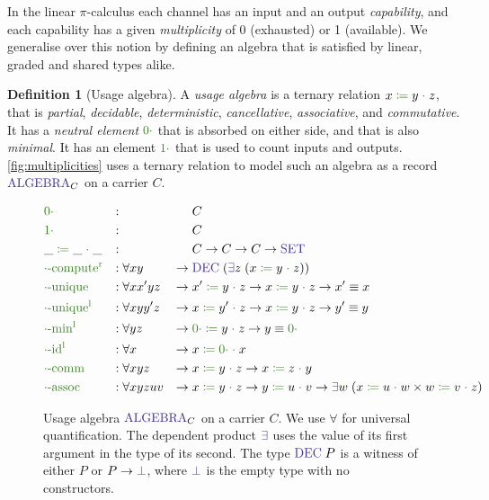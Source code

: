 \documentclass[a4paper,UKenglish,cleveref,autoref,thm-restate,authorcolumns]{lipics-v2019}
\theoremstyle{definition}
\newtheorem{nidefinition}{Definition}
\newcommand{\picalc}{$\pi$-calculus}
\newcommand{\type}[1]{\textcolor{BlueViolet}{\operatorname{#1}}}
\newcommand{\func}[1]{\textcolor{OliveGreen}{\operatorname{#1}}}
\newcommand{\op}[3]{#1 \; \func{\coloneqq} \; #2 \; \func{\cdot} \; #3}
\newcommand{\zero}{\func{0\cdot}}
\newcommand{\one}{\func{1\cdot}}
\newcommand{\Set}{\type{SET}}
\newcommand{\Algebra}{\type{ALGEBRA}}
\begin{document}
In the linear \picalc{} each channel has an input and an output \emph{capability}, and each capability has a given \emph{multiplicity} of 0 (exhausted) or 1 (available).
We generalise over this notion by defining an algebra that is satisfied by linear, graded and shared types alike.

\begin{nidefinition}[Usage algebra]
  A \emph{usage algebra} is a ternary relation $\op{x}{y}{z}$, that is \emph{partial}, \emph{decidable}, \emph{deterministic}, \emph{cancellative}, \emph{associative}, and \emph{commutative}.
  It has a \emph{neutral element} $\zero$ that is absorbed on either side, and that is also \emph{minimal}.
  It has an element $\one$ that is used to count inputs and outputs.
  \autoref{fig:multiplicities} uses a ternary relation to model such an algebra as a record $\Algebra_C$ on a carrier $C$.

  \begin{figure}[h]
  \begin{equation*}
  \begin{aligned}
    &\zero                   &:{} &                 &        & C \\
    &\one                    &:{} &                 &        & C \\
    &\op{\_}{\_}{\_}         &:{} &                 &        & C \to C \to C \to \Set \\
    &\func{\cdot-compute^r}  &:{} &\forall x y       & \to \; & \type{DEC} \; (\type{\exists} z  \; (\op{x}{y}{z})) \\
    &\func{\cdot-unique}     &:{} &\forall x x' y z  & \to \; & \op{x'}{y}{z} \to \op{x}{y}{z} \to x' \equiv x \\
    &\func{\cdot-unique^l}   &:{} &\forall x y y' z  & \to \; & \op{x}{y'}{z} \to \op{x}{y}{z} \to y' \equiv y \\
    &\func{\cdot-min^l}      &:{} &\forall y z        & \to \; & \op{\zero}{y}{z} \to y \equiv \zero \\
    &\func{\cdot-id^l}       &:{} &\forall x         & \to \; & \op{x}{\zero}{x} \\
    &\func{\cdot-comm}       &:{} &\forall x y z     & \to \; & \op{x}{y}{z} \to \op{x}{z}{y} \\
    &\func{\cdot-assoc}      &:{} &\forall x y z u v & \to \; & \op{x}{y}{z} \to \op{y}{u}{v} \to \type{\exists} w  \; (\op{x}{u}{w} \times \op{w}{v}{z})
  \end{aligned}
  \end{equation*}
  \caption{
    Usage algebra $\Algebra_C$ on a carrier $C$.
    We use $\forall$ for universal quantification.
    The dependent product $\type{\exists}$ uses the value of its first argument in the type of its second.
    The type $\type{DEC} \; P$ is a witness of either $P$ or $P \to \type{\bot}$, where $\type{\bot}$ is the empty type with no constructors.
  }
  \label{fig:multiplicities}
  \end{figure}
\end{nidefinition}
\end{document}
